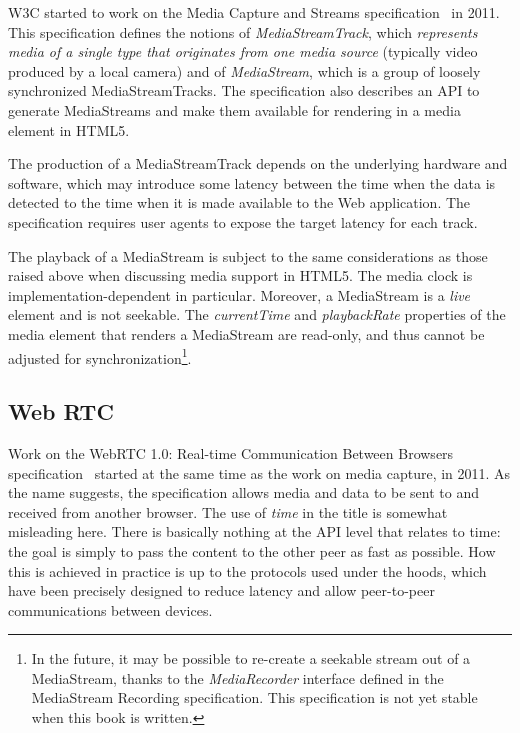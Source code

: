 W3C started to work on the Media Capture and Streams
specification~\cite{capture} in 2011. This specification defines the notions
of \emph{MediaStreamTrack}, which \emph{represents media of a single type that
originates from one media source} (typically video produced by a local camera)
and of \emph{MediaStream}, which is a group of loosely synchronized
MediaStreamTracks. The specification also describes an API to generate
MediaStreams and make them available for rendering in a media element in
HTML5.

The production of a MediaStreamTrack depends on the underlying hardware and
software, which may introduce some latency between the time when the data is
detected to the time when it is made available to the Web application. The
specification requires user agents to expose the target latency for each
track.

The playback of a MediaStream is subject to the same considerations as those
raised above when discussing media support in HTML5. The media clock is
implementation-dependent in particular. Moreover, a MediaStream is a
\emph{live} element and is not seekable. The \emph{currentTime} and
\emph{playbackRate} properties of the media element that renders a MediaStream
are read-only, and thus cannot be adjusted for synchronization\footnote{In the
future, it may be possible to re-create a seekable stream out of a
MediaStream, thanks to the \emph{MediaRecorder} interface defined in the
MediaStream Recording specification. This specification is not yet stable when
this book is written.}.


\subsection{Web RTC}
\label{sec:webrtc}

Work on the WebRTC 1.0: Real-time Communication Between Browsers
specification~\cite{webrtc}  started at the same time as the work on media
capture, in 2011. As the name suggests, the specification allows media and
data to be sent to and received from another browser. The use of \emph{time}
in the title is somewhat misleading here. There is basically nothing at the
API level that relates to time: the goal is simply to pass the content to the
other peer as fast as possible. How this is achieved in practice is up to the
protocols used under the hoods, which have been precisely designed to reduce
latency and allow peer-to-peer communications between devices.


